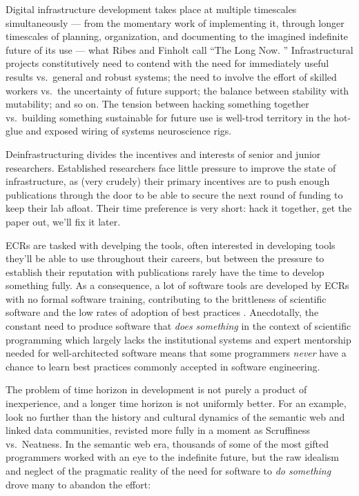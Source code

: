 \documentclass[10pt]{article}
\begin{document}
\begin{multicols}{2}
Digital infrastructure development takes place at multiple timescales
simultaneously --- from the momentary work of implementing it, through
longer timescales of planning, organization, and documenting to the
imagined indefinite future of its use --- what Ribes and Finholt call
``The Long Now. \cite{ribesLongNowTechnology2009} ''
Infrastructural projects constitutively need to contend with the need
for immediately useful results vs.~general and robust systems; the need
to involve the effort of skilled workers vs.~the uncertainty of future
support; the balance between stability with mutability; and so on. The
tension between hacking something together vs.~building something
sustainable for future use is well-trod territory in the hot-glue and
exposed wiring of systems neuroscience rigs.

Deinfrastructuring divides the incentives and interests of senior and
junior researchers. Established researchers face little pressure to
improve the state of infrastructure, as (very crudely) their primary
incentives are to push enough publications through the door to be able
to secure the next round of funding to keep their lab afloat. Their time
preference is very short: hack it together, get the paper out, we'll fix
it later.

ECRs are tasked with develping the tools, often interested in developing
tools they'll be able to use throughout their careers, but between the
pressure to establish their reputation with publications rarely have the
time to develop something fully. As a consequence, a lot of software
tools are developed by ECRs with no formal software training,
contributing to the brittleness of scientific software and the low rates
of adoption of best practices \cite{altschulAnatomySuccessfulComputational2013} . Anecdotally, the
constant need to produce software that \emph{does something} in the
context of scientific programming which largely lacks the institutional
systems and expert mentorship needed for well-architected software means
that some programmers \emph{never} have a chance to learn best practices
commonly accepted in software engineering.

The problem of time horizon in development is not purely a product of
inexperience, and a longer time horizon is not uniformly better. For an
example, look no further than the history and cultural dynamics of the
semantic web and linked data communities, revisted more fully in a
moment as Scruffiness vs.~Neatness. In the semantic web era, thousands
of some of the most gifted programmers worked with an eye to the
indefinite future, but the raw idealism and neglect of the pragmatic
reality of the need for software to \emph{do something} drove many to
abandon the effort:


\end{multicols}
\end{document}
